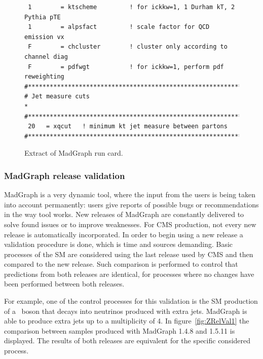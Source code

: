 \begin{itemize}
\begin{figure}[!Hhtbp]
\begin{center}
\begin{minipage}[c]{0.7\textwidth}
\begin{verbatim}
 1        = ktscheme         ! for ickkw=1, 1 Durham kT, 2 Pythia pTE
 1        = alpsfact         ! scale factor for QCD emission vx
 F        = chcluster        ! cluster only according to channel diag
 F        = pdfwgt           ! for ickkw=1, perform pdf reweighting
#*********************************************************************
# Jet measure cuts                                                   *
#*********************************************************************
 20   = xqcut   ! minimum kt jet measure between partons
#*********************************************************************
\end{verbatim}
\normalsize
        \end{minipage}
          \caption{Extract of MadGraph run card.}
          \label{fig:RunCard}
      \end{center}
    \end{figure}

\end{itemize}


\subsubsection{MadGraph release validation}

MadGraph is a very dynamic tool, where the input from the users is being taken into account permanently: users give reports of possible bugs or recommendations in the way tool works. New releases of MadGraph are constantly delivered to solve found issues or to improve weaknesses. For CMS production, not every new release is automatically incorporated. In order to begin using a new release a validation procedure is done, which is time and sources demanding. Basic processes of the SM are considered using the last release used by CMS and then compared to the new release. Such comparison is performed to control that predictions from both releases are identical, for processes where no changes have been performed between both releases. 

For example, one of the control processes for this validation is the SM production of a \Z~boson that decays into neutrinos produced with extra jets. MadGraph is able to produce extra jets up to a multiplicity of 4. In figure~\ref{fig:ZRelVal1} the comparison between samples produced with MadGraph 1.4.8 and 1.5.11 is displayed. The results of both releases are equivalent for the specific considered process.

